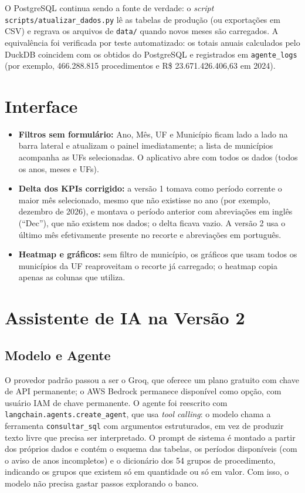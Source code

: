 \documentclass[12pt,a4paper]{report}
\begin{document}
O PostgreSQL continua sendo a fonte de verdade: o \textit{script}
\texttt{scripts/atualizar\_dados.py} lê as tabelas de produção (ou exportações em CSV) e
regrava os arquivos de \texttt{data/} quando novos meses são carregados. A equivalência foi
verificada por teste automatizado: os totais anuais calculados pelo DuckDB coincidem com
os obtidos do PostgreSQL e registrados em \texttt{agente\_logs} (por exemplo, 466.288.815
procedimentos e R\$ 23.671.426.406,63 em 2024).

\section{Interface}

\begin{itemize}
    \item \textbf{Filtros sem formulário:} Ano, Mês, UF e Município ficam lado a lado na
    barra lateral e atualizam o painel imediatamente; a lista de municípios acompanha as
    UFs selecionadas. O aplicativo abre com todos os dados (todos os anos, meses e UFs).
    \item \textbf{Delta dos KPIs corrigido:} a versão 1 tomava como período corrente o
    maior mês selecionado, mesmo que não existisse no ano (por exemplo, dezembro de 2026),
    e montava o período anterior com abreviações em inglês (``Dec''), que não existem nos
    dados; o delta ficava vazio. A versão 2 usa o último mês efetivamente presente no
    recorte e abreviações em português.
    \item \textbf{Heatmap e gráficos:} sem filtro de município, os gráficos que usam todos
    os municípios da UF reaproveitam o recorte já carregado; o heatmap copia apenas as
    colunas que utiliza.
\end{itemize}

\section{Assistente de IA na Versão 2}

\subsection{Modelo e Agente}

O provedor padrão passou a ser o Groq, que oferece um plano gratuito com chave de API
permanente; o AWS Bedrock permanece disponível como opção, com usuário IAM de chave
permanente. O agente foi reescrito com \texttt{langchain.agents.create\_agent}, que usa
\textit{tool calling}: o modelo chama a ferramenta \texttt{consultar\_sql} com argumentos
estruturados, em vez de produzir texto livre que precisa ser interpretado. O prompt de
sistema é montado a partir dos próprios dados e contém o esquema das tabelas, os períodos
disponíveis (com o aviso de anos incompletos) e o dicionário dos 54 grupos de
procedimento, indicando os grupos que existem só em quantidade ou só em valor. Com isso, o
modelo não precisa gastar passos explorando o banco.
\end{document}
